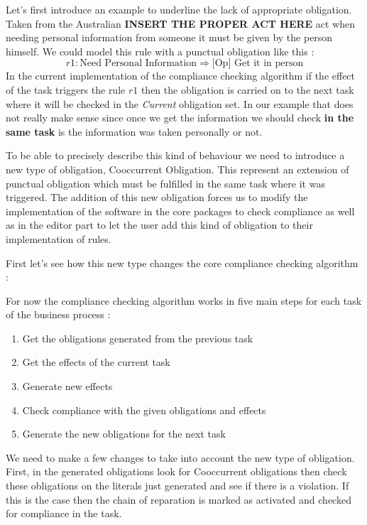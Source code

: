 \documentclass[10pt]{article}
\begin{document}
Let's first introduce an example to underline the lack of appropriate obligation. Taken from the Australian \textbf{INSERT THE PROPER ACT HERE} act when needing personal information from someone it must be given by the person himself. We could model this rule with a punctual obligation like this :
\begin{equation}
r1 : \text{Need Personal Information} \Rightarrow \text{[Op] Get it in person}
\end{equation}
In the current implementation of the compliance checking algorithm if the effect of the task triggers the rule $r1$ then the obligation is carried on to the next task where it will be checked in the \textit{Current} obligation set. In our example that does not really make sense since once we get the information we should check \textbf{in the same task} is the information was taken personally or not.

To be able to precisely describe this kind of behaviour we need to introduce a new type of obligation, Cooccurrent Obligation. This represent an extension of punctual obligation which must be fulfilled in the same task where it was triggered. The addition of this new obligation forces us to modify the implementation of the software in the core packages to check compliance as well as in the editor part to let the user add this kind of obligation to their implementation of rules.

First let's see how this new type changes the core compliance checking algorithm :

For now the compliance checking algorithm works in five main steps for each task of the business process :
\begin{enumerate}
\item Get the obligations generated from the previous task
\item Get the effects of the current task
\item Generate new effects
\item Check compliance with the given obligations and effects
\item Generate the new obligations for the next task
\end{enumerate}

We need to make a few changes to take into account the new type of obligation. First, in the generated obligations look for Cooccurrent obligations then check these obligations on the literals just generated and see if there is a violation. If this is the case then the chain of reparation is marked as activated and checked for compliance in the task.
\end{document}
